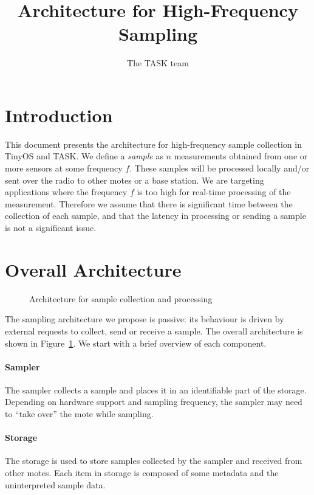 \documentclass{article}
\title{Architecture for High-Frequency Sampling}
\author{The TASK team}
\begin{document}
\maketitle

\section{Introduction}

This document presents the architecture for high-frequency sample
collection in TinyOS and TASK. We define a \emph{sample} as $n$
measurements obtained from one or more sensors at some frequency $f$. These
samples will be processed locally and/or sent over the radio to other motes
or a base station. We are targeting applications where the frequency $f$ is
too high for real-time processing of the measurement. Therefore we assume
that there is significant time between the collection of each sample, and
that the latency in processing or sending a sample is not a significant
issue.

\section{Overall Architecture}

\begin{figure}[t]
  \caption{Architecture for sample collection and processing}
  \label{fig:arch}
\end{figure}

The sampling architecture we propose is passive: its behaviour is driven by
external requests to collect, send or receive a sample. The overall
architecture is shown in Figure~\ref{fig:arch}. We start with a brief
overview of each component.

\paragraph{Sampler} The sampler collects a sample and places it in an
identifiable part of the storage. Depending on hardware support and
sampling frequency, the sampler may need to ``take over'' the mote
while sampling.

\paragraph{Storage} The storage is used to store samples collected by
the sampler and received from other motes. Each item in storage is composed
of some metadata and the uninterpreted sample data.
\end{document}
